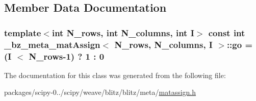 \subsection{Member Data Documentation}
\hypertarget{class__bz__meta__matAssign_ad4682ac57b1b8afabbdc279d157669fe}{}
\subsubsection[{go}]{\setlength{\rightskip}{0pt plus 5cm}template$<$int N\+\_\+rows, int N\+\_\+columns, int I$>$ const int {\bf \+\_\+bz\+\_\+meta\+\_\+mat\+Assign}$<$ N\+\_\+rows, N\+\_\+columns, I $>$\+::go = (I $<$ N\+\_\+rows-\/1) ? 1 \+: 0\hspace{0.3cm}{\ttfamily [static]}}\label{class__bz__meta__matAssign_ad4682ac57b1b8afabbdc279d157669fe}


The documentation for this class was generated from the following file\+:\begin{DoxyCompactItemize}
\item 
packages/scipy-\/0../scipy/weave/blitz/blitz/meta/\hyperlink{matassign_8h}{matassign.\+h}\end{DoxyCompactItemize}
